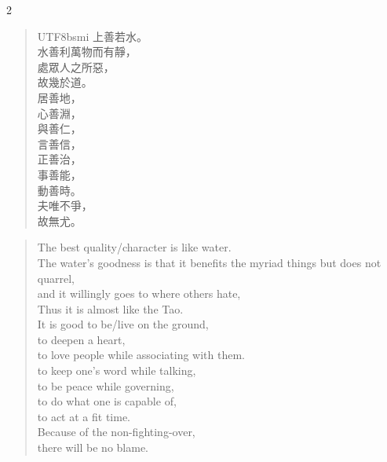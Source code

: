 \begin{paracol}{2}
\begin{verse}
\begin{CJK*}{UTF8}{bsmi}
上善若水。\\
水善利萬物而有靜，\\
處眾人之所惡，\\
故幾於道。\\
居善地，\\
心善淵，\\
與善仁，\\
言善信，\\
正善治，\\
事善能，\\
動善時。\\
夫唯不爭，\\
故無尤。
\end{CJK*}
\end{verse}
\switchcolumn
\begin{verse}
The best quality/character is like water.\\
The water's goodness is that it benefits the myriad things but does not quarrel,\\
and it willingly goes to where others hate,\\
Thus it is almost like the Tao.\\
It is good to be/live on the ground,\\
to deepen a heart,\\
to love people while associating with them.\\
to keep one's word while talking,\\
to be peace while governing,\\
to do what one is capable of,\\
to act at a fit time.\\
Because of the non-fighting-over,\\
there will be no blame.
\end{verse}
\end{paracol}



